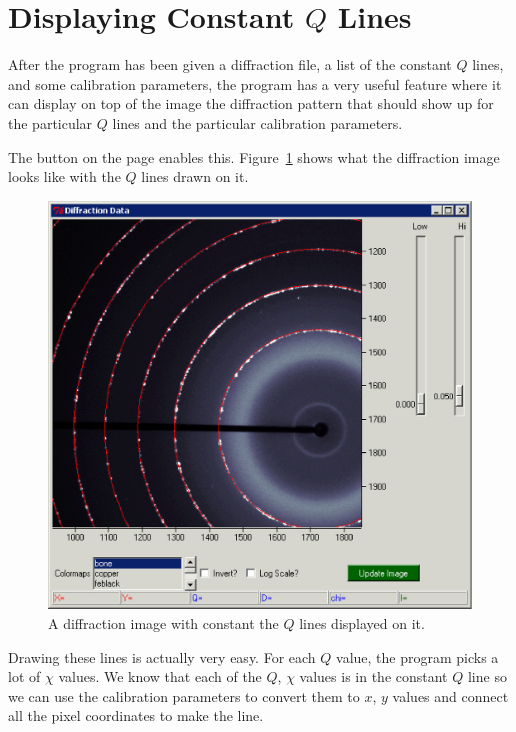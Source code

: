\section{\texorpdfstring{Displaying Constant $Q$ 
    Lines}{Displaying Constant Q Lines}}
    \label{displayconstQlines}

After the program has been given a diffraction file,
a list of the constant $Q$ lines, and some
calibration parameters, the program has a very
useful feature where it can display on top of
the image the diffraction pattern that should
show up for the particular $Q$ lines and the
particular calibration parameters.

The  button on the 
 page enables this.
Figure~\ref{constant_q_lines_on_diffraction_image}
shows what the diffraction image looks like with
the $Q$ lines drawn on it.

\begin{figure}
    \centering
    \includegraphics[scale=.75]{figures/constant_q_lines_on_diffraction_image.eps}
    \caption{A diffraction image with constant the 
    $Q$ lines displayed on it.}
    \label{constant_q_lines_on_diffraction_image}
\end{figure}

Drawing these lines is actually very easy. For
each $Q$ value, the program picks a lot of
$\chi$ values. We know that each of the $Q$, $\chi$
values is in the constant $Q$ line so we can use
the calibration parameters to convert them to $x$, $y$
values and connect all the pixel coordinates to 
make the line.

